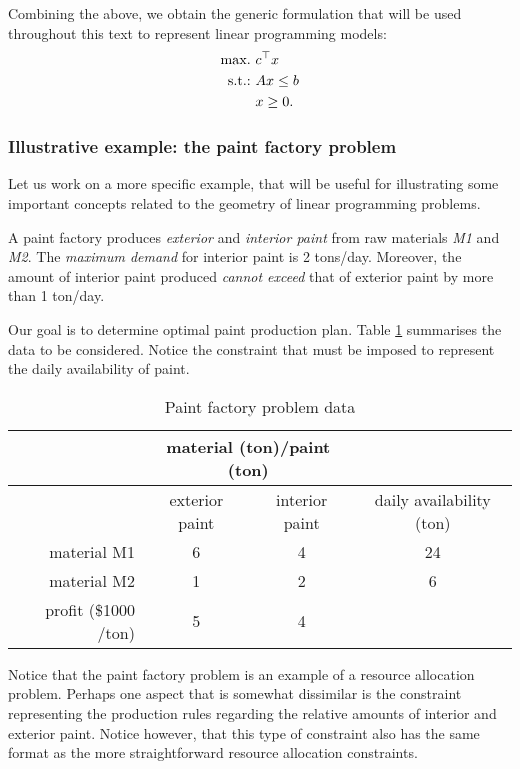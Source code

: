 Combining the above, we obtain the generic formulation that will be used throughout this text to represent linear programming models:
%
\begin{align}
	\mathop{\text{max.~}} & c^\top x  \label{p1c1:eq:LP_objective} \\
	\mathop{\text{s.t.:~}}   & Ax \leq b \label{p1c1:eq:LP_constraint} \\
		  & x \geq 0. \label{p1c1:eq:LP_domain}
\end{align}
%

\subsubsection{Illustrative example: the paint factory problem}
 
Let us work on a more specific example, that will be useful for illustrating some important concepts related to the geometry of linear programming problems.

A paint factory produces \emph{exterior} and \emph{interior paint} from raw materials \emph{M1} and \emph{M2}. The \emph{maximum demand} for interior paint is 2 tons/day. Moreover, the amount of interior paint produced \emph{cannot exceed} that of exterior paint by more than 1 ton/day. 

Our goal is to determine optimal paint production plan. Table \ref{p1c1:tab:paint_factory_problem_data} summarises the data to be considered. Notice the constraint that must be imposed to represent the daily availability of paint.

\begin{table}[h]
	\begin{tabular}{rccc} \hline
	&\multicolumn{2}{c}{material (ton)/paint (ton)}\\ \hline
	& exterior paint & interior paint & daily availability (ton)\\ \hline
	material M1 & 6 & 4 & 24\\
	material M2 & 1 & 2 & 6\\ \hline
	profit (\$1000 /ton) & 5 & 4\\ \hline
	\end{tabular}
	\caption{Paint factory problem data} \label{p1c1:tab:paint_factory_problem_data}
\end{table}

Notice that the paint factory problem is an example of a resource allocation problem. Perhaps one aspect that is somewhat dissimilar is the constraint representing the production rules regarding the relative amounts of interior and exterior paint. Notice however, that this type of constraint also has the same format as the more straightforward resource allocation constraints.  

